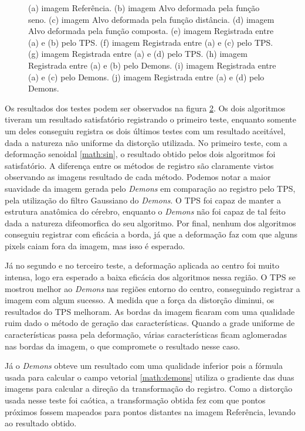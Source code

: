\begin{figure}[H]
\begin{subfigure}[t]{0.25\textwidth}
	  \label{fig:sindist-image-demon}
	\end{subfigure}
	\caption{(a) imagem Referência. (b) imagem Alvo deformada pela função seno. (c) imagem Alvo deformada pela função 
			distância. (d) imagem Alvo deformada pela função composta. (e) imagem Registrada entre (a) e (b) pelo TPS. 
			(f) imagem Registrada entre (a) e (c) pelo TPS. (g) imagem Registrada entre (a) e (d) pelo TPS. (h) imagem 
			Registrada entre (a) e (b) pelo Demons. (i) imagem Registrada entre (a) e (c) pelo Demons. (j) imagem 
			Registrada entre (a) e (d) pelo Demons.}
	\label{fig:resultados}
\end{figure}

	Os resultados dos testes podem ser observados na figura \ref{fig:resultados}.
Os dois algoritmos tiveram um resultado satisfatório registrando o primeiro teste, enquanto somente um deles conseguiu
registra os dois últimos testes com um resultado aceitável, dada a natureza não uniforme da distorção utilizada. 
No primeiro teste, com a deformação senoidal \ref{math:sin}, o resultado obtido pelos dois algoritmos foi satisfatório.
A diferença entre os métodos de registro são claramente vistos observando as imagens resultado de cada método. Podemos
notar a maior suavidade da imagem gerada pelo \textit{Demons} em comparação ao registro pelo TPS, pela utilização do
filtro Gaussiano do \textit{Demons}. O TPS foi capaz de manter a estrutura anatômica do cérebro, enquanto o 
\textit{Demons} não foi capaz de tal feito dada a natureza difeomorfica do seu algoritmo. Por final, nenhum dos 
algoritmos conseguiu registrar com eficácia a borda, já que a deformação faz com que alguns pixels caiam fora da 
imagem, mas isso é esperado.

  Já no segundo e no terceiro teste, a deformação aplicada ao centro foi muito intensa, logo era esperado a baixa 
eficácia dos algoritmos nessa região. O TPS se mostrou melhor ao \textit{Demons} nas regiões entorno do centro, 
conseguindo registrar a imagem com algum sucesso. A medida que a força da distorção diminui, os resultados do TPS 
melhoram. As bordas da imagem ficaram com uma qualidade ruim dado o método de geração das características. Quando a 
grade uniforme de características passa pela deformação, várias características ficam aglomeradas nas bordas da imagem, 
o que compromete o resultado nesse caso.

	Já o \textit{Demons} obteve um resultado com uma qualidade inferior pois a fórmula usada para calcular o campo 
vetorial \ref{math:demons} utiliza o gradiente das duas imagens para calcular a direção da transformação do registro. 
Como a distorção usada nesse teste foi caótica, a transformação obtida fez com que pontos próximos fossem mapeados para 
pontos distantes na imagem Referência, levando ao resultado obtido.

